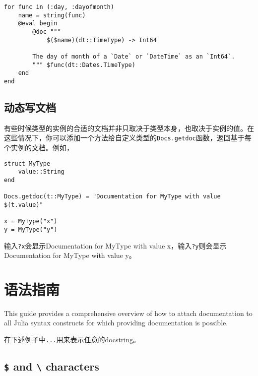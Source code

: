 \begin{verbatim}
for func in (:day, :dayofmonth)
    name = string(func)
    @eval begin
        @doc """
            $($name)(dt::TimeType) -> Int64

        The day of month of a `Date` or `DateTime` as an `Int64`.
        """ $func(dt::Dates.TimeType)
    end
end
\end{verbatim}



\hypertarget{7588661187190124361}{}


\subsection{动态写文档}



有些时候类型的实例的合适的文档并非只取决于类型本身，也取决于实例的值。在这些情况下，你可以添加一个方法给自定义类型的\texttt{Docs.getdoc}函数，返回基于每个实例的文档。例如，




\begin{verbatim}
struct MyType
    value::String
end

Docs.getdoc(t::MyType) = "Documentation for MyType with value $(t.value)"

x = MyType("x")
y = MyType("y")
\end{verbatim}



输入\texttt{?x}会显示{\textquotedbl}Documentation for MyType with value x{\textquotedbl}，输入\texttt{?y}则会显示{\textquotedbl}Documentation for MyType with value y{\textquotedbl}。



\hypertarget{12360783788480513081}{}


\section{语法指南}



This guide provides a comprehensive overview of how to attach documentation to all Julia syntax constructs for which providing documentation is possible.



在下述例子中\texttt{{\textquotedbl}...{\textquotedbl}}用来表示任意的docstring。



\hypertarget{4617511478986608909}{}


\subsection{\texttt{\$} and \texttt{{\textbackslash}} characters}



